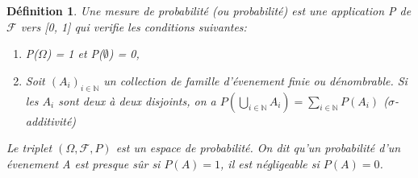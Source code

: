 \documentclass[a4paper, 12pt, french]{report}
\theoremstyle{break}
\newtheorem{defin}{Définition}[section]
\begin{document}
\begin{defin}
	Une mesure de probabilité (ou probabilité) est une application P de $\mathcal{F}$ vers [0, 1] qui verifie les conditions suivantes:
	\begin{enumerate}
		\item P($\Omega$) = 1 et P($\emptyset$) = 0,
		\item Soit $(A_{i})_{i \in \mathbb{N}}$ un collection de famille d'évenement finie ou dénombrable. Si les $A_{i}$ sont deux à deux disjoints, on a $P(\displaystyle\bigcup_{i \in  \mathbb{N}}A_{i}) = \displaystyle\sum_{i \in \mathbb{N}} P(A_{i})$ ($\sigma$-additivité)
	\end{enumerate}
	Le triplet $(\Omega, \mathcal{F}, P)$ est un espace de probabilité. On dit qu'un probabilité d'un évenement A est presque sûr si $P(A) = 1$, il est négligeable si $P(A)=0$.
\end{defin} 
\end{document}
